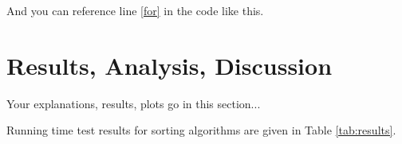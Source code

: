 \documentclass[11pt]{article}
\begin{document}
And you can reference line \ref{for} in the code like this.

\section{Results, Analysis, Discussion}

Your explanations, results, plots go in this section...

Running time test results for sorting algorithms are given in Table \ref{tab:results}. 

\begin{table}[ht!]
\centering
\caption{Results of the running time tests performed for varying input sizes (in ms).}
\label{tab:results}
\end{table}
\end{document}
